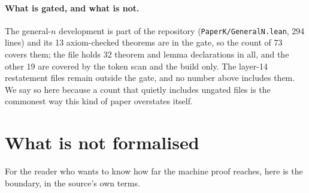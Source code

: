 \documentclass[11pt]{article}
\theoremstyle{definition}
\theoremstyle{remark}
\begin{document}
\paragraph{What is gated, and what is not.} The general-$n$ development is part of the repository
(\texttt{PaperK/GeneralN.lean}, 294 lines) and its 13 axiom-checked theorems are in the gate, so the
count of 73 covers them; the file holds 32 theorem and lemma declarations in all, and the other 19
are covered by the token scan and the build only. The layer-14 restatement files remain outside the
gate, and no number above includes them. We say so here because a count that quietly includes
ungated files is the commonest way this kind of paper overstates itself.

\section{What is not formalised}\label{sec:not}

For the reader who wants to know how far the machine proof reaches, here is the boundary, in the
source's own terms.
\end{document}
